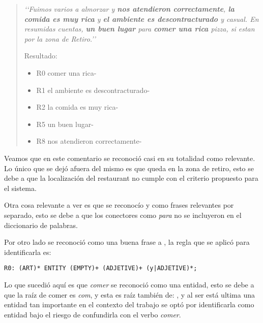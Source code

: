 \begin{quotation}

\emph{
\lq{}\lq{}Fuimos varios a almorzar y {\bf nos atendieron correctamente}, {\bf la comida es muy rica} y {\bf el ambiente es descontracturado} y casual.  En resumidas cuentas, {\bf un buen lugar} para {\bf comer una rica} pizza, si estan por la zona de Retiro.\rq{}\rq{}
}


Resultado:
\begin{itemize}
\item R0  comer una rica-
\item R1  el ambiente es descontracturado-
\item R2  la comida es muy rica-
\item R5  un buen lugar-
\item R8  nos atendieron correctamente-
\end{itemize}

\end{quotation}

Veamos que en este comentario se reconoció casi en su totalidad como relevante. Lo único que se dejó afuera del mismo es que queda en la zona de retiro, esto se debe a que la localización del restaurant no cumple con el criterio propuesto para el sistema.

Otra cosa relevante a ver es que se reconocío  y  como frases relevantes por separado, esto se debe a que los conectores como \emph{para} no se incluyeron en el diccionario de palabras.

Por otro lado se reconoció como una buena frase a , la regla que se aplicó para identificarla es:

\begin{verbatim}
R0: (ART)* ENTITY (EMPTY)+ (ADJETIVE)+ (y|ADJETIVE)*;
\end{verbatim}

Lo que sucedió aquí es que \emph{comer} se reconoció como una entidad, esto se debe a que la raíz de comer es \emph{com}, y esta es raíz también de: , y al ser está ultima una entidad tan importante en el contexto del trabajo se optó por identificarla como entidad bajo el riesgo de confundirla con el verbo \emph{comer}.

